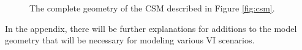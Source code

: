 \begin{figure}[htb!]
  \caption{The complete geometry of the CSM described in Figure \ref{fig:csm}.}
  \label{fig:geometry}
\end{figure}

In the appendix, there will be further explanations for additions to the model geometry that will be necessary for modeling various VI scenarios.\par
